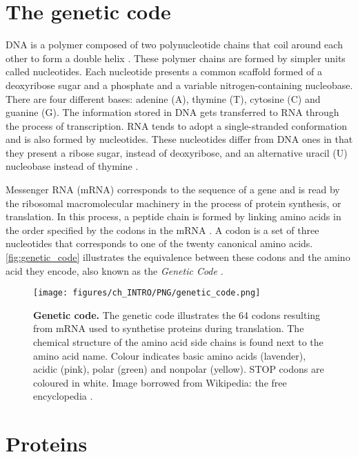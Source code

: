 \section{The genetic code}

DNA is a polymer composed of two polynucleotide chains that coil around each other to form a double helix \cite{WATSON_1953_DNA}. These polymer chains are formed by simpler units called nucleotides. Each nucleotide presents a common scaffold formed of a deoxyribose sugar and a phosphate and a variable nitrogen-containing nucleobase. There are four different bases: adenine (A), thymine (T), cytosine (C) and guanine (G). The information stored in DNA gets transferred to RNA through the process of transcription. RNA tends to adopt a single-stranded conformation and is also formed by nucleotides. These nucleotides differ from DNA ones in that they present a ribose sugar, instead of deoxyribose, and an alternative uracil (U) nucleobase instead of thymine \cite{LEVENE_1909_NUCLEICS}.

Messenger RNA (mRNA) corresponds to the sequence of a gene and is read by the ribosomal macromolecular machinery in the process of protein synthesis, or translation. In this process, a peptide chain is formed by linking amino acids in the order specified by the codons in the mRNA \cite{CRICK_1957_CODE}. A codon is a set of three nucleotides that corresponds to one of the twenty canonical amino acids. \autoref{fig:genetic_code} illustrates the equivalence between these codons and the amino acid they encode, also known as the \textit{Genetic Code} \cite{GAMOW_1954_CODE}.

\begin{figure}[htb!]
    \centering
    \texttt{[image: figures/ch\_INTRO/PNG/genetic\_code.png]}
    \caption[Genetic code]{\textbf{Genetic code.} The genetic code illustrates the 64 codons resulting from mRNA used to synthetise proteins during translation. The chemical structure of the amino acid side chains is found next to the amino acid name. Colour indicates basic amino acids (lavender), acidic (pink), polar (green) and nonpolar (yellow). STOP codons are coloured in white. Image borrowed from Wikipedia: the free encyclopedia \cite{genetic_code_image}.}
    \label{fig:genetic_code}
\end{figure}

\section{Proteins}

